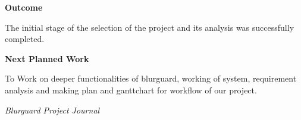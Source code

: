 \documentclass[12pt,a4paper]{article}
\begin{document}
\vspace{8pt}


\textbf{\large Outcome}

\vspace{4pt}

The initial stage of the selection of the project and its analysis was successfully completed.

\vspace{8pt}


\textbf{\large Next Planned Work}

\vspace{4pt}

To Work on deeper functionalities of blurguard, working of system, requirement analysis and making plan and ganttchart for workflow of our project. 

\vfill


\begin{flushright}
    \textit{Blurguard Project Journal}
\end{flushright}
\end{document}
